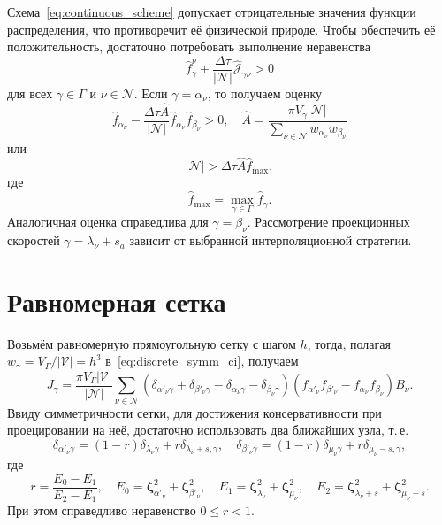 \documentclass[a4paper,12pt]{article}
\newcommand{\bzeta}{\boldsymbol{\zeta}}
\newcommand{\Nu}{\mathcal{N}}
\begin{document}
Схема~\eqref{eq:continuous_scheme} допускает отрицательные значения функции распределения,
что противоречит её физической природе. Чтобы обеспечить её положительность,
достаточно потребовать выполнение неравенства
\begin{equation}\label{eq:positive_f}
   \hat{f}_\gamma^\nu + \frac{\Delta\tau}{|\Nu|}\hat{\mathscr{J}}_{\gamma\nu} > 0
\end{equation}
для всех \(\gamma\in\Gamma\) и \(\nu\in\Nu\).
Если \(\gamma = \alpha_\nu\), то получаем оценку
\begin{equation}\label{eq:positive_f_alpha}
   \hat{f}_{\alpha_\nu} - \frac{\Delta\tau \hat{A}}{|\Nu|}\hat{f}_{\alpha_\nu}\hat{f}_{\beta_\nu} > 0, \quad
   \hat{A} = \frac{\pi V_\gamma|\Nu|}{\sum_{\nu\in\Nu} w_{\alpha_\nu}w_{\beta_\nu}}
\end{equation}
или
\begin{equation}\label{eq:positive_f_alpha2}
   |\Nu| > \Delta\tau \hat{A} \hat{f}_{\max},
\end{equation}
где
\begin{equation}\label{eq:hat_f_max}
   \hat{f}_{\max} = \max_{\gamma\in\Gamma} \hat{f}_\gamma.
\end{equation}
Аналогичная оценка справедлива для \(\gamma = \beta_\nu\).
Рассмотрение проекционных скоростей \(\gamma = \lambda_\nu+s_a\)
зависит от выбранной интерполяционной стратегии.

\section{Равномерная сетка}

Возьмём равномерную прямоугольную сетку с шагом \(h\), тогда,
полагая \(w_\gamma = V_\Gamma/|\mathcal{V}| = h^3\) в~\eqref{eq:discrete_symm_ci}, получаем
\begin{equation}\label{eq:discrete_symm_ci_uniform}
    J_\gamma = \frac{\pi V_\Gamma|\mathcal{V}|}{|\Nu|}
        \sum_{\nu\in\Nu} \left(
            \delta_{\alpha'_\nu\gamma} + \delta_{\beta'_\nu\gamma}
            - \delta_{\alpha_\nu\gamma} - \delta_{\beta_\nu\gamma}
        \right)\left( f_{\alpha'_\nu} f_{\beta'_\nu} - f_{\alpha_\nu} f_{\beta_\nu} \right)B_\nu.
\end{equation}
Ввиду симметричности сетки, для достижения консервативности при проецировании на неё,
достаточно использовать два ближайших узла, т.\,е.
\begin{equation}\label{eq:uniform_projection}
    \delta_{\alpha'_\nu\gamma} = (1-r)\delta_{\lambda_\nu\gamma} + r\delta_{\lambda_\nu+s,\gamma}, \quad
    \delta_{\beta'_\nu\gamma} = (1-r)\delta_{\mu_\nu\gamma} + r\delta_{\mu_\nu-s,\gamma},
\end{equation}
где
\begin{equation}\label{eq:r_uniform}
    r = \frac{E_0-E_1}{E_2-E_1}, \quad
    E_0 = \bzeta_{\alpha'_\nu}^2 + \bzeta_{\beta'_\nu}^2, \quad
    E_1 = \bzeta_{\lambda_\nu}^2 + \bzeta_{\mu_\nu}^2, \quad
    E_2 = \bzeta_{\lambda_\nu+s}^2 + \bzeta_{\mu_\nu-s}^2.
\end{equation}
При этом справедливо неравенство \(0\leq r < 1\).
\end{document}

